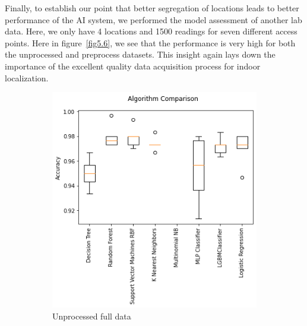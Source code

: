 \documentclass[a4paper,singleside,12pt]{report} %
\begin{document}
			Finally, to establish our point that better segregation of locations leads to better performance of the AI system, we performed the model assessment of another lab data.
			Here, we only have 4 locations and 1500 readings for seven different access points. 
			Here in figure~\ref{fig5.6}, we see that the performance is very high for both the unprocessed and preprocess datasets.
			This insight again lays down the importance of the excellent quality data acquisition process for indoor localization.
			
			\begin{figure}[!htb]
			  \centering
			  \begin{subfigure}[b]{0.48\linewidth}
			    \includegraphics[width=\linewidth]{./figures/results_model_comparison_unprocessed_full_data_lab.png}
			     \caption{Unprocessed full data}
			  \end{subfigure}
			  \begin{subfigure}[b]{0.48\linewidth}

\end{subfigure}
\end{figure}
\end{document}
